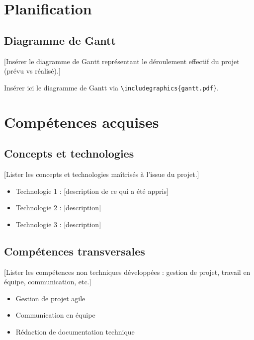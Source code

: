 \documentclass[12pt, a4paper]{article}
\begin{document}
\section{Planification}

\subsection{Diagramme de Gantt}

[Insérer le diagramme de Gantt représentant le déroulement effectif du projet
(prévu vs réalisé).]

\begin{remarque}
  Insérer ici le diagramme de Gantt via
  \texttt{\textbackslash includegraphics\{gantt.pdf\}}.
\end{remarque}

\section{Compétences acquises}

\subsection{Concepts et technologies}

[Lister les concepts et technologies maîtrisés à l'issue du projet.]

\begin{itemize}
  \item Technologie 1 : [description de ce qui a été appris]
  \item Technologie 2 : [description]
  \item Technologie 3 : [description]
\end{itemize}

\subsection{Compétences transversales}

[Lister les compétences non techniques développées : gestion de projet,
travail en équipe, communication, etc.]

\begin{itemize}
  \item Gestion de projet agile
  \item Communication en équipe
  \item Rédaction de documentation technique
\end{itemize}
\end{document}
